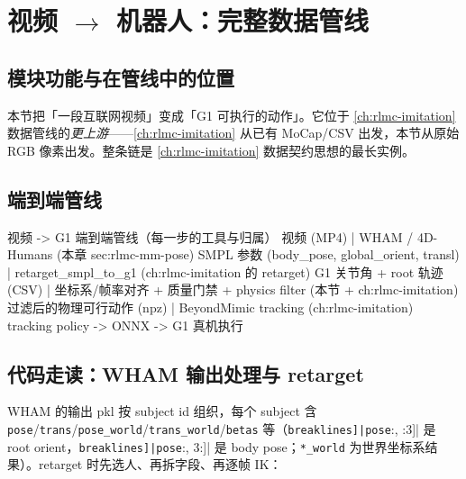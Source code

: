 \section{\texorpdfstring{视频 $\to$ 机器人：完整数据管线}{视频到机器人：完整数据管线}}
\label{sec:rlmc-mm-video}

\subsection{模块功能与在管线中的位置}
\label{sec:rlmc-mm-video-pos}

本节把「一段互联网视频」变成「G1 可执行的动作」。它位于 \cref{ch:rlmc-imitation} 数据管线的\emph{更上游}——\cref{ch:rlmc-imitation} 从已有 MoCap/CSV 出发，本节从原始 RGB 像素出发。整条链是 \cref{ch:rlmc-imitation} 数据契约思想的最长实例。

\subsection{端到端管线}
\label{sec:rlmc-mm-video-pipeline}

\begin{codebox}{视频 -> G1 端到端管线（每一步的工具与归属）}
视频 (MP4)
  | WHAM / 4D-Humans                         (本章 sec:rlmc-mm-pose)
SMPL 参数 (body_pose, global_orient, transl)
  | retarget_smpl_to_g1                       (ch:rlmc-imitation 的 retarget)
G1 关节角 + root 轨迹 (CSV)
  | 坐标系/帧率对齐 + 质量门禁 + physics filter  (本节 + ch:rlmc-imitation)
过滤后的物理可行动作 (npz)
  | BeyondMimic tracking                      (ch:rlmc-imitation)
tracking policy -> ONNX -> G1 真机执行
\end{codebox}

\subsection{代码走读：WHAM 输出处理与 retarget}
\label{sec:rlmc-mm-video-retarget}

WHAM 的输出 pkl 按 subject id 组织，每个 subject 含 \verb|pose|/\allowbreak\verb|trans|/\allowbreak\verb|pose_world|/\allowbreak\verb|trans_world|/\allowbreak\verb|betas| 等（\Verb[breaklines]|pose[:, :3]| 是 root orient，\Verb[breaklines]|pose[:, 3:]| 是 body pose；\verb|*_world| 为世界坐标系结果）。retarget 时先选人、再拆字段、再逐帧 IK：

